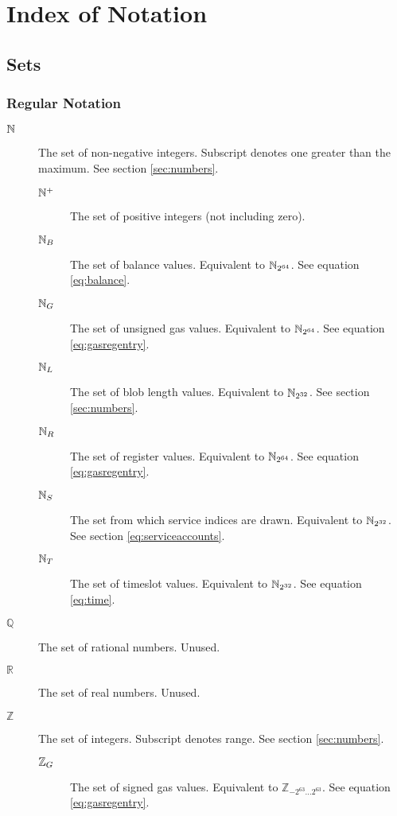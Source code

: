 \section{Index of Notation}\label{sec:definitions}

\subsection{Sets}

\subsubsection{Regular Notation}
\begin{description}
  \item[$\mathbb{N}$] The set of non-negative integers. Subscript denotes one greater than the maximum. See section \ref{sec:numbers}.
  \begin{description}
    \item[$\mathbb{N}^+$] The set of positive integers (not including zero).
    \item[$\mathbb{N}_B$] The set of balance values. Equivalent to $\mathbb{N}_{2^{64}}$. See equation \ref{eq:balance}.
    \item[$\mathbb{N}_G$] The set of unsigned gas values. Equivalent to $\mathbb{N}_{2^{64}}$. See equation \ref{eq:gasregentry}.
    \item[$\mathbb{N}_L$] The set of blob length values. Equivalent to $\mathbb{N}_{2^{32}}$. See section \ref{sec:numbers}.
    \item[$\mathbb{N}_R$] The set of register values. Equivalent to $\mathbb{N}_{2^{64}}$. See equation \ref{eq:gasregentry}.
    \item[$\mathbb{N}_S$] The set from which service indices are drawn. Equivalent to $\mathbb{N}_{2^{32}}$. See section \ref{eq:serviceaccounts}.
    \item[$\mathbb{N}_T$] The set of timeslot values. Equivalent to $\mathbb{N}_{2^{32}}$. See equation \ref{eq:time}.
  \end{description}
  \item[$\mathbb{Q}$] The set of rational numbers. Unused.
  \item[$\mathbb{R}$] The set of real numbers. Unused.
  \item[$\mathbb{Z}$] The set of integers. Subscript denotes range. See section \ref{sec:numbers}.
  \begin{description}
    \item[$\mathbb{Z}_G$] The set of signed gas values. Equivalent to $\mathbb{Z}_{-2^{63}\dots2^{63}}$. See equation \ref{eq:gasregentry}.
  \end{description}
\end{description}

